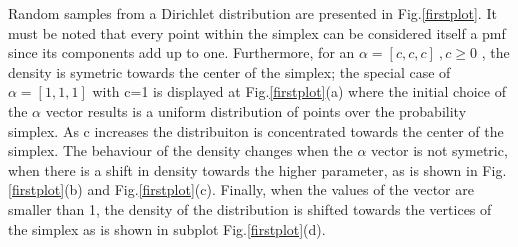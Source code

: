 \documentclass[twoside,hidelinks]{article}
\begin{document}
Random samples from a Dirichlet distribution are presented in Fig.\ref{firstplot}. It must be noted that every point within the simplex can be considered itself a pmf since its components add up to one.  Furthermore, for an $ \alpha = [c,c,c]\ ,c \ge 0 $ , the density is symetric towards the center of the simplex; the special case of $ \alpha = [1,1,1] $ with c=1 is displayed at Fig.\ref{firstplot}(a) where the initial choice of the $\alpha$ vector results is a uniform distribution of points over the probability simplex. As c increases the distribuiton is concentrated towards the center of the simplex. The behaviour of the density changes when the $\alpha$ vector is not symetric, when there is a shift in density towards the higher parameter, as is shown in Fig.\ref{firstplot}(b) and Fig.\ref{firstplot}(c). Finally, when the values of the vector are smaller than 1, the density of the distribution is shifted towards the vertices of the simplex as is shown in subplot Fig.\ref{firstplot}(d).
\end{document}
